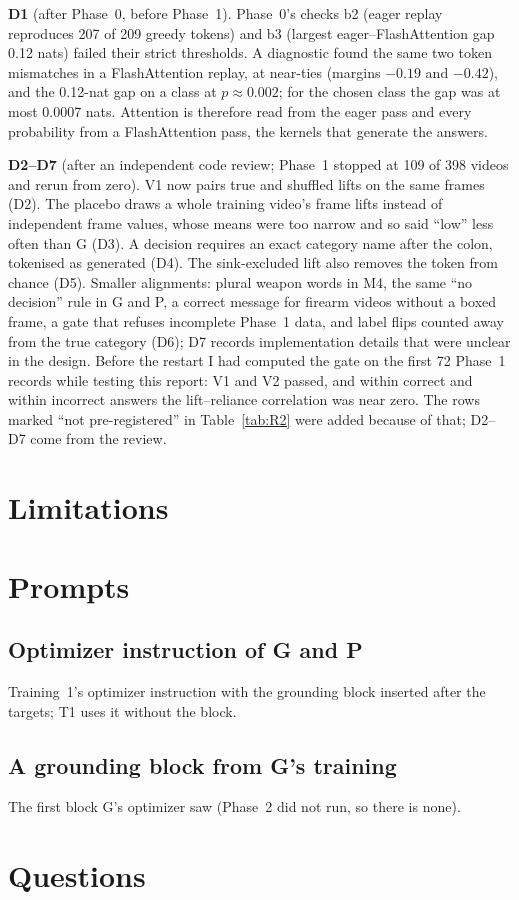 \documentclass[11pt]{article}
\begin{document}
\textbf{D1} (after Phase~0, before Phase~1). Phase~0's checks b2 (eager replay reproduces 207 of 209 greedy tokens) and b3 (largest eager--FlashAttention gap 0.12 nats) failed their strict thresholds. A diagnostic found the same two token mismatches in a FlashAttention replay, at near-ties (margins $-0.19$ and $-0.42$), and the 0.12-nat gap on a class at $p\approx0.002$; for the chosen class the gap was at most 0.0007 nats. Attention is therefore read from the eager pass and every probability from a FlashAttention pass, the kernels that generate the answers.

\textbf{D2--D7} (after an independent code review; Phase~1 stopped at 109 of 398 videos and rerun from zero). V1 now pairs true and shuffled lifts on the same frames (D2). The placebo draws a whole training video's frame lifts instead of independent frame values, whose means were too narrow and so said ``low'' less often than G (D3). A decision requires an exact category name after the colon, tokenised as generated (D4). The sink-excluded lift also removes the token from chance (D5). Smaller alignments: plural weapon words in M4, the same ``no decision'' rule in G and P, a correct message for firearm videos without a boxed frame, a gate that refuses incomplete Phase~1 data, and label flips counted away from the true category (D6); D7 records implementation details that were unclear in the design. Before the restart I had computed the gate on the first 72 Phase~1 records while testing this report: V1 and V2 passed, and within correct and within incorrect answers the lift--reliance correlation was near zero. The rows marked ``not pre-registered'' in Table~\ref{tab:R2} were added because of that; D2--D7 come from the review.

\section{Limitations}





\appendix
\section{Prompts}\label{app:prompts}
\subsection*{Optimizer instruction of G and P}
Training~1's optimizer instruction with the grounding block inserted after the targets; T1 uses it without the block.

\subsection*{A grounding block from G's training}
The first block G's optimizer saw (Phase~2 did not run, so there is none).


\section{Questions}\label{app:questions}

\end{document}
